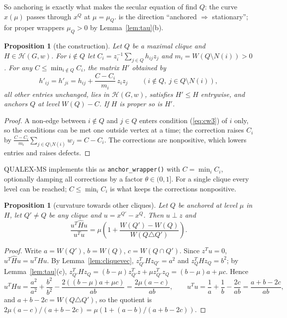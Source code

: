 \documentclass[11pt]{article}
\newtheorem{prop}[thm]{Proposition}
\theoremstyle{definition}
\theoremstyle{remark}
\newcommand{\Hc}{\mathcal{H}}
\newcommand{\hH}{\hat{H}}
\begin{document}
So anchoring is exactly what makes the secular equation of \cite{CW} find
$Q$: the curve $x(\mu)$ passes through $x^Q$ at $\mu=\mu_Q$. \cite[Theorem~2]{CW}
is the direction ``anchored $\Rightarrow$ stationary''; for proper wrappers
$\mu_Q>0$ by Lemma~\ref{lem:tau}(b).

\begin{prop}[the construction]
\label{prop:construct}
Let $Q$ be a maximal clique and $H\in\Hc(G,w)$. For $i\notin Q$ let
$C_i=z_i^{-1}\sum_{j\in Q}h_{ij}z_j$ and $m_i=W(Q\setminus N(i))>0$. For
any $C\leq\min_{i\notin Q}C_i$, the matrix $H'$ obtained by
\[ h'_{ij}=h'_{ji}=h_{ij}+\frac{C-C_i}{m_i}\,z_iz_j
\qquad (i\notin Q,\ j\in Q\setminus N(i)), \]
all other entries unchanged, lies in $\Hc(G,w)$, satisfies $H'\leq H$
entrywise, and anchors $Q$ at level $W(Q)-C$. If $H$ is proper so is $H'$.
\end{prop}
\begin{proof}
A non-edge between $i\notin Q$ and $j\in Q$ enters condition
(\ref{eq:cw3}) of $i$ only, so the conditions can be met one outside vertex
at a time; the correction raises $C_i$ by
$\frac{C-C_i}{m_i}\sum_{j\in Q\setminus N(i)}w_j=C-C_i$. The corrections
are nonpositive, which lowers entries and raises defects.
\end{proof}

QUALEX-MS implements this as \texttt{anchor\_wrapper()} with $C=\min_iC_i$,
optionally damping all corrections by a factor $\theta\in(0,1]$. For a single
clique every level can be reached; $C\leq\min_iC_i$ is what keeps the
corrections nonpositive.

\begin{prop}[curvature towards other cliques]
\label{prop:curv}
Let $Q$ be anchored at level $\mu$ in $H$, let $Q'\neq Q$ be any clique and
$u=x^{Q'}-x^Q$. Then $u\perp z$ and
\[ \frac{u^T\hH u}{u^Tu} = \mu\left(1+\frac{W(Q')-W(Q)}{W(Q\triangle Q')}
\right). \]
\end{prop}
\begin{proof}
Write $a=W(Q')$, $b=W(Q)$, $c=W(Q\cap Q')$. Since $z^Tu=0$,
$u^T\hH u=u^THu$. By Lemma~\ref{lem:cliquevec}, $z_{Q'}^THz_{Q'}=a^2$ and
$z_Q^THz_Q=b^2$; by Lemma~\ref{lem:tau}(c),
$z_{Q'}^THz_Q=(b-\mu)z_{Q'}^Tz+\mu z_{Q'}^Tz_Q=(b-\mu)a+\mu c$. Hence
\[ u^THu=\frac{a^2}{a^2}+\frac{b^2}{b^2}-\frac{2((b-\mu)a+\mu c)}{ab}
=\frac{2\mu(a-c)}{ab},\qquad
u^Tu=\frac1a+\frac1b-\frac{2c}{ab}=\frac{a+b-2c}{ab}, \]
and $a+b-2c=W(Q\triangle Q')$, so the quotient is
$2\mu(a-c)/(a+b-2c)=\mu(1+(a-b)/(a+b-2c))$.
\end{proof}
\end{document}
